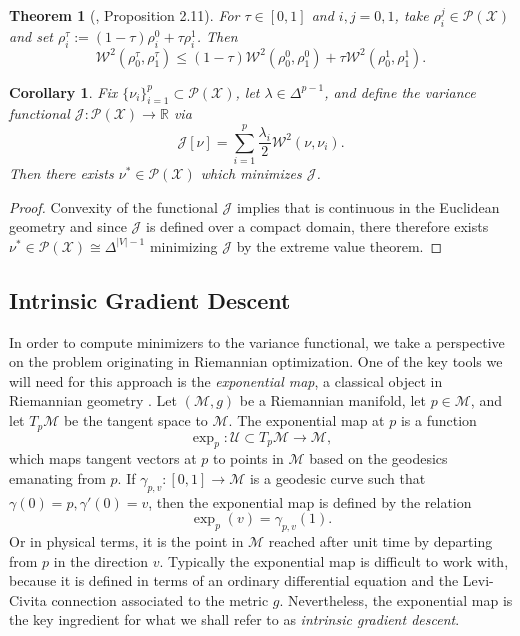 \documentclass{article}
\newtheorem{theorem}{Theorem}
\newtheorem{corollary}{Corollary}
\newcommand{\R}{\mathbb{R}}
\newcommand{\M}{\mathcal{M}}
\newcommand{\J}{\mathcal{J}}
\newcommand{\U}{\mathcal{U}}
\newcommand{\W}{\mathcal{W}}
\newcommand{\X}{\mathcal{X}}
\begin{document}
\begin{theorem}[\cite{erbarRicciCurvatureFinite2012}, Proposition 2.11]
    For \(\tau \in [0,1]\) and \(i,j=0,1\), take \(\rho_i^j \in \mathcal{P}(\X)\) and set \(\rho_i^\tau := (1-\tau)\rho_i^0 + \tau\rho_i^1\). Then
    \[\W^2(\rho_{0}^\tau, \rho_1^{\tau}) \le (1- \tau)\W^2(\rho_0^0, \rho_1^0) + \tau\W^2(\rho_0^1,\rho_1^1).\]
\end{theorem}

\begin{corollary}
    Fix \(\{\nu_i\}_{i=1}^p \subset \mathcal{P}(\X)\), let \(\lambda\in\Delta^{p-1}\), and define the variance functional \newline \(\J: \mathcal{P}(\X) \to \R\) via
    \begin{equation}
    \label{GraphVF}
        \J[\nu] = \sum\limits_{i=1}^p \frac{\lambda_i}{2}\W^2(\nu,\nu_i).
    \end{equation}
    Then there exists \(\nu^* \in \mathcal{P}(\X)\) which minimizes \(\J\).
\end{corollary}
\begin{proof}
    Convexity of the functional \(\J\) implies that is continuous in the Euclidean geometry and since \(\J\) is defined over a compact domain, there therefore exists \(\nu^* \in \mathcal{P}(\X) \cong \Delta^{|V|-1}\) minimizing \(\J\) by the extreme value theorem.
\end{proof}


\subsection{Intrinsic Gradient Descent}
In order to compute minimizers to the variance functional, we take a perspective on the problem originating in Riemannian optimization. One of the key tools we will need for this approach is the \emph{exponential map}, a classical object in Riemannian geometry \cite{tuDifferentialGeometry2017}. 
Let \((\M, g)\) be a Riemannian manifold, let \(p \in \M\), and let \(T_p\M\) be the tangent space to \(\M\). The exponential map at \(p\) is a function 
\begin{equation*}
    \exp_p:\U\subset T_p\M \to\M, 
\end{equation*}
which maps tangent vectors at \(p\) to points in \(\M\) based on the geodesics emanating from \(p\).  If \(\gamma_{p,v}:[0,1]\to\M\) is a geodesic curve such that \(\gamma(0) = p, \gamma'(0) = v\), then the exponential map is defined by the relation
\begin{equation*}
    \exp_p(v) = \gamma_{p,v}(1).
\end{equation*}
Or in physical terms, it is the point in \(\M\) reached after unit time by departing from \(p\) in the direction \(v\). Typically the exponential map is difficult to work with, because it is defined in terms of an ordinary differential equation and the Levi-Civita connection associated to the metric \(g\). Nevertheless, the exponential map is the key ingredient for what we shall refer to as \emph{intrinsic gradient descent}. 
\end{document}
